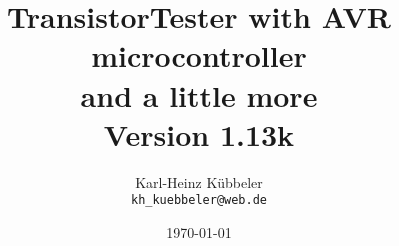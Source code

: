 \documentclass[12pt,a4paper,oneside,english]{report}
\begin{document}
\newcommand\electricC {
\hspace{-14 pt}
\begin{circuitikz}
\draw (0,0) to[capacitor] (0:1);
\end{circuitikz}
\hspace{-6 pt}
}
\newcommand\electricR {
\hspace{-14 pt}
\begin{circuitikz}
\draw (0,0) to[european resistor] (0:1);
\end{circuitikz}
\hspace{-6 pt}
}
\newcommand\electricL {
\hspace{-14 pt}
\begin{circuitikz}
\draw (0,0) 
 to[american inductor] (-1,0) 
;\end{circuitikz}
\hspace{-6 pt}
}
\newcommand\electricDAK {
\begin{circuitikz}
\draw (0,0) to[full diode] (0:1);
\end{circuitikz}
}
\newcommand\electricDKA {
\begin{circuitikz}
\draw (0,0) to[full diode] (180:1);
\end{circuitikz}
}
\title{TransistorTester with AVR microcontroller \\
and a little more\\
Version 1.13k \\
}
\author{Karl-Heinz K\"ubbeler\\
\texttt{kh\_kuebbeler@web.de}}
\date{\today}
\maketitle
\tableofcontents













 
 
 
 
 
 





\end{document}
